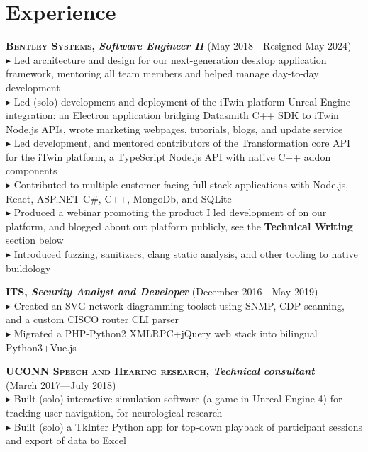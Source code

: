 \documentclass[Letterpaper,11pt]{article}
\newcommand\bul{$\blacktriangleright$ }
\begin{document}
\section*{Experience}
    \textbf{\textsc{Bentley Systems}, \textit{Software Engineer II}} (May 2018---Resigned May 2024)\\
        \bul Led architecture and design for our next-generation desktop application framework, mentoring all team members and helped manage day-to-day development
        \\
        \bul Led (solo) development and deployment of the iTwin platform Unreal Engine integration: an Electron application bridging Datasmith C++ SDK to iTwin Node.js APIs,
            wrote marketing webpages, tutorials, blogs, and update service
        \\
        \bul Led development, and mentored contributors of the Transformation core API for the iTwin platform, a TypeScript Node.js API with native C++ addon components
        \\
        \bul Contributed to multiple customer facing full-stack applications with Node.js, React, ASP.NET C\#, C++, MongoDb, and SQLite
        \\
        \bul Produced a webinar promoting the product I led development of on our platform, and blogged about out platform publicly, see the \textbf{Technical Writing} section below
        \\
        \bul Introduced fuzzing, sanitizers, clang static analysis, and other tooling to native buildology

    \textbf{\textsc{ITS}, \textit{Security Analyst and Developer}} (December 2016---May 2019)\\
        \bul Created an SVG network diagramming toolset using SNMP, CDP scanning,
        and a custom CISCO router CLI parser
        \\
        \bul Migrated a PHP-Python2 XMLRPC+jQuery web stack into bilingual Python3+Vue.js

    \textbf{\textsc{UCONN Speech and Hearing research}, \textit{Technical consultant}}\\
    (March 2017---July 2018)\\
        \bul Built (solo) interactive simulation software (a game in Unreal Engine 4)
        for tracking user navigation, for neurological research
        \\
        \bul Built (solo) a TkInter Python app for top-down playback of participant sessions and export of data to Excel
        
\end{document}
